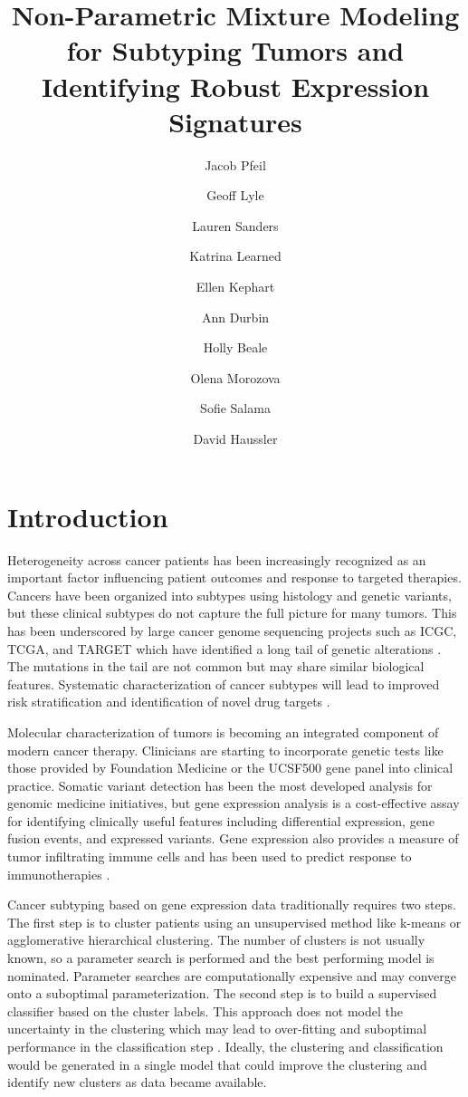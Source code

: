\documentclass[fleqn,10pt]{wlscirep}
\title{Non-Parametric Mixture Modeling for Subtyping Tumors and Identifying Robust Expression Signatures}
\author[1,*]{Jacob Pfeil}
\author[1]{Geoff Lyle}
\author[1]{Lauren Sanders}
\author[1]{Katrina Learned}
\author[1]{Ellen Kephart}
\author[1]{Ann Durbin}
\author[1]{Holly Beale}
\author[1]{Olena Morozova}
\author[1]{Sofie Salama}
\author[1]{David Haussler}
\affil[1]{University of California, Santa Cruz, Biomolecular Engineering, Santa Cruz, 95064, United States}
\affil[*]{jpfeil@ucsc.edu}
\begin{document}
\flushbottom
\maketitle
%
%
\thispagestyle{empty}


\section*{Introduction}

Heterogeneity across cancer patients has been increasingly recognized as an important factor influencing patient outcomes and response to targeted therapies. Cancers have been organized into subtypes using histology and genetic variants, but these clinical subtypes do not capture the full picture for many tumors. This has been underscored by large cancer genome sequencing projects such as ICGC, TCGA, and TARGET which have identified a long tail of genetic alterations \cite{armenia2018long}. The mutations in the tail are not common but may share similar biological features. Systematic characterization of cancer subtypes will lead to improved risk stratification and identification of novel drug targets \cite{zhao2018molecular}.

Molecular characterization of tumors is becoming an integrated component of modern cancer therapy. Clinicians are starting to incorporate genetic tests like those provided by Foundation Medicine or the UCSF500 gene panel into clinical practice. Somatic variant detection has been the most developed analysis for genomic medicine initiatives, but gene expression analysis is a cost-effective assay for identifying clinically useful features including differential expression, gene fusion events, and expressed variants. Gene expression also provides a measure of tumor infiltrating immune cells and has been used to predict response to immunotherapies \cite{auslander2018robust}.

Cancer subtyping based on gene expression data traditionally requires two steps. The first step is to cluster patients using an unsupervised method like k-means or agglomerative hierarchical clustering. The number of clusters is not usually known, so a parameter search is performed and the best performing model is nominated. Parameter searches are computationally expensive and may converge onto a suboptimal parameterization. The second step is to build a supervised classifier based on the cluster labels. This approach does not model the uncertainty in the clustering which may lead to over-fitting and suboptimal performance in the classification step \cite{zhao2018molecular}. Ideally, the clustering and classification would be generated in a single model that could improve the clustering and identify new clusters as data became available.
\end{document}
